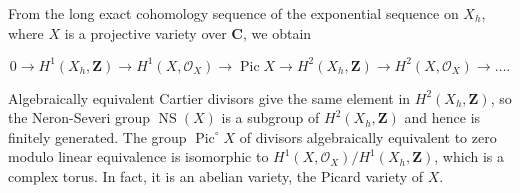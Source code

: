 From the long exact cohomology sequence of the exponential sequence on $X_h$, where $X$ is a projective variety over $\mathbf{C}$, we obtain

$$0 \rightarrow H^1(X_h, \mathbf{Z}) \rightarrow H^1(X, \mathcal{O}_X) \rightarrow \operatorname{Pic} X \rightarrow H^2(X_h, \mathbf{Z}) \rightarrow H^2(X, \mathcal{O}_X) \rightarrow \dots.$$

Algebraically equivalent Cartier divisors give the same element in $H^2(X_h, \mathbf{Z})$, so the Neron-Severi group $\operatorname{NS}(X)$ is a subgroup of $H^2(X_h, \mathbf{Z})$ and hence is finitely generated. The group $\operatorname{Pic}^\circ X$ of divisors algebraically equivalent to zero modulo linear equivalence is isomorphic to $H^1(X, \mathcal{O}_X)/H^1(X_h, \mathbf{Z})$, which is a complex torus. In fact, it is an abelian variety, the Picard variety of $X$.